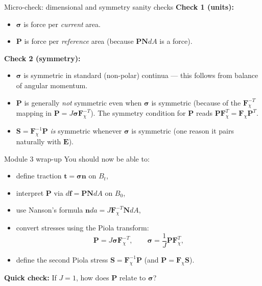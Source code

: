 \documentclass[aspectratio=169]{beamer}
\newcommand{\Eten}{\bm{E}}     %
\newcommand{\sigmaC}{\bm{\sigma}} %
\newcommand{\Sten}{\bm{S}}     %
\newcommand{\Nvec}{\bm{N}}     %
\newcommand{\nvec}{\bm{n}}     %
\newcommand{\tvec}{\bm{t}}     %
\newcommand{\Fdef}{\bm{F}_{\chi}}  %
\newcommand{\Pten}{\bm{P}}         %
\begin{document}
\begin{frame}{Micro-check: dimensional and symmetry sanity checks}
\small
\textbf{Check 1 (units):}
\begin{itemize}
\item \(\sigmaC\) is force per \emph{current} area.
\item \(\Pten\) is force per \emph{reference} area (because \(\Pten \Nvec dA\) is a force).
\end{itemize}

\medskip
\textbf{Check 2 (symmetry):}
\begin{itemize}
\item \(\sigmaC\) is symmetric in standard (non-polar) continua --- this follows from balance of angular momentum.
\item \(\Pten\) is generally \emph{not} symmetric even when \(\sigmaC\) is symmetric (because of the \(\Fdef^{-T}\) mapping in \(\Pten = J\sigmaC\Fdef^{-T}\)). The symmetry condition for \(\Pten\) reads \(\Pten\Fdef^T = \Fdef\Pten^T\).
\item \(\Sten = \Fdef^{-1}\Pten\) \emph{is} symmetric whenever \(\sigmaC\) is symmetric (one reason it pairs naturally with \(\Eten\)).
\end{itemize}

\end{frame}

\begin{frame}{Module 3 wrap-up}
\small
You should now be able to:
\begin{itemize}
\item define traction \(\tvec=\sigmaC\nvec\) on \(B_t\),
\item interpret \(\Pten\) via \(d\bm{f}=\Pten\Nvec dA\) on \(B_0\),
\item use Nanson's formula \(\nvec da = J\Fdef^{-T}\Nvec dA\),
\item convert stresses using the Piola transform:
\[
\Pten = J\sigmaC\Fdef^{-T}, \qquad \sigmaC = \frac{1}{J}\Pten\Fdef^T,
\]
\item define the second Piola stress \(\Sten=\Fdef^{-1}\Pten\) (and \(\Pten=\Fdef\Sten\)).
\end{itemize}

\medskip
\textbf{Quick check:} If \(J=1\), how does \(\Pten\) relate to \(\sigmaC\)?
\end{frame}


\end{document}

